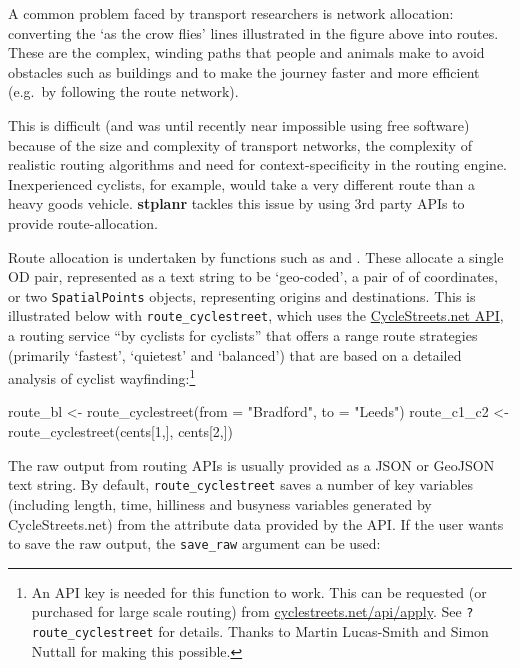 A common problem faced by transport researchers is network allocation:
converting the `as the crow flies' lines illustrated in the figure above
into routes. These are the complex, winding paths that people and
animals make to avoid obstacles such as buildings and to make the
journey faster and more efficient (e.g.~by following the route network).

This is difficult (and was until recently near impossible using free
software) because of the size and complexity of transport networks, the
complexity of realistic routing algorithms and need for
context-specificity in the routing engine. Inexperienced cyclists, for
example, would take a very different route than a heavy goods vehicle.
\textbf{stplanr} tackles this issue by using 3rd party APIs to provide
route-allocation.

Route allocation is undertaken by  functions such as
 and \linebreak {}.
These allocate a single OD pair, represented as a text string to be
`geo-coded', a pair of of coordinates, or two \texttt{SpatialPoints}
objects, representing origins and destinations. This is illustrated
below with \texttt{route\_cyclestreet}, which uses the
\href{https://www.cyclestreets.net/api/}{CycleStreets.net API}, a routing
service ``by cyclists for cyclists'' that offers a range route
strategies (primarily `fastest', `quietest' and `balanced') that are
based on a detailed analysis of cyclist wayfinding:\footnote{An API key
  is needed for this function to work. This can be requested (or
  purchased for large scale routing) from
  \href{https://www.cyclestreets.net/api/apply/}{cyclestreets.net/api/apply}.
  See \texttt{?route\_cyclestreet} for details. Thanks to Martin
  Lucas-Smith and Simon Nuttall for making this possible.}

\begin{Schunk}
\begin{Sinput}
route_bl <- route_cyclestreet(from = "Bradford", to = "Leeds")
route_c1_c2 <- route_cyclestreet(cents[1,], cents[2,])
\end{Sinput}
\end{Schunk}

The raw output from routing APIs is usually provided as a JSON or
GeoJSON text string. By default, \texttt{route\_cyclestreet} saves a
number of key variables (including length, time, hilliness and busyness
variables generated by CycleStreets.net) from the attribute data
provided by the API. If the user wants to save the raw output, the
\texttt{save\_raw} argument can be used:

